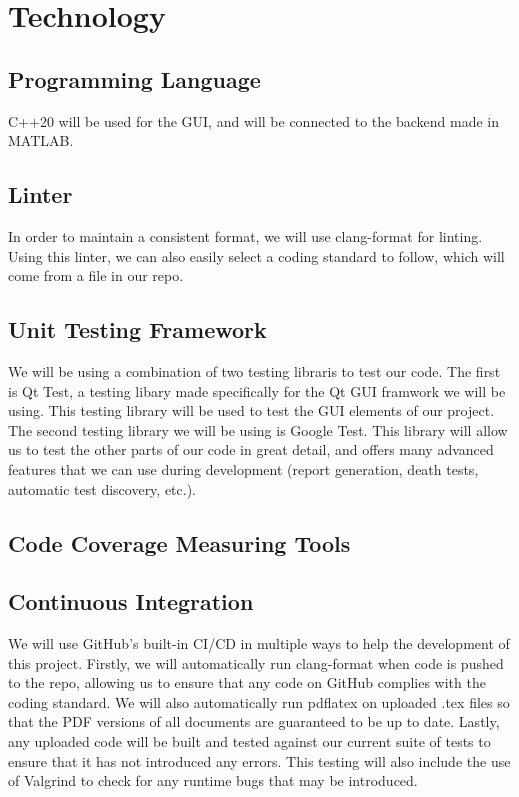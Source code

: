 \documentclass{article}
\begin{document}
\section{Technology}

\subsection{Programming Language}
C++20 will be used for the GUI, and will be connected to the backend made in MATLAB.

\subsection{Linter}
In order to maintain a consistent format, we will use clang-format for linting. Using this linter, 
we can also easily select a coding standard to follow, which will come from a file in our repo.

\subsection{Unit Testing Framework}
We will be using a combination of two testing libraris to test our code. The first is Qt Test, a testing libary made specifically for the Qt GUI framwork we will be using. This testing library will be used to test the GUI elements of our project.
The second testing library we will be using is Google Test. This library will allow us to test the other parts of our code in great detail, and offers many advanced features that we can use during development (report generation, death tests, automatic test discovery, etc.).

\subsection{Code Coverage Measuring Tools}

\subsection{Continuous Integration}
We will use GitHub's built-in CI/CD in multiple ways to help the development of this project. Firstly, we will automatically run clang-format when code is pushed to the repo, allowing us to ensure that any code on GitHub complies with the coding standard.
We will also automatically run pdflatex on uploaded .tex files so that the PDF versions of all documents are guaranteed to be up to date. Lastly, any uploaded code will be built and tested against our current suite of tests to ensure that it has not introduced any errors.
This testing will also include the use of Valgrind to check for any runtime bugs that may be introduced.
\end{document}
